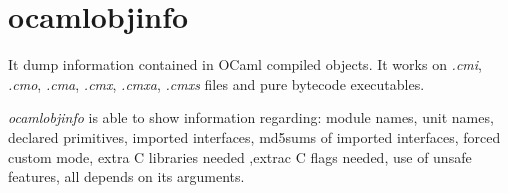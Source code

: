 
\section{ocamlobjinfo}
\label{sec:ocamlobjinfo}

It dump information contained in OCaml compiled objects. It works on
\textit{.cmi}, \textit{.cmo}, \textit{.cma}, \textit{.cmx}, \textit{.cmxa}, \textit{.cmxs} files and pure bytecode
executables.

\textit{ocamlobjinfo} is able to show information regarding: module
names, unit names, declared primitives, imported interfaces,
md5sums of imported interfaces, forced custom mode, extra C libraries needed
,extrac C flags needed, use of unsafe features, all  depends on its arguments.


